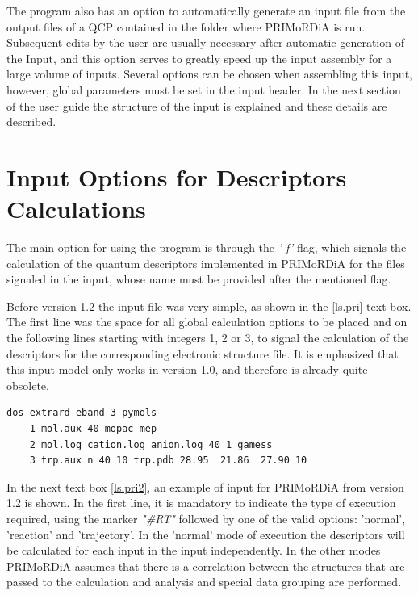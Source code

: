 \documentclass[a4paper,11pt]{refart}
\begin{document}
The program also has an option to automatically generate an input file from the output files of a QCP contained in the folder where PRIMoRDiA is run. Subsequent edits by the user are usually necessary after automatic generation of the Input, and this option serves to greatly speed up the input assembly for a large volume of inputs. Several options can be chosen when assembling this input, however, global parameters must be set in the input header. In the next section of the user guide the structure of the input is explained and these details are described.

\newpage

\section{Input Options for Descriptors Calculations}

The main option for using the program is through the \emph{'-f'} flag, which signals the calculation of the quantum descriptors implemented in PRIMoRDiA for the files signaled in the input, whose name must be provided after the mentioned flag.

Before version 1.2 the input file was very simple, as shown in the \autoref{ls.pri} text box. The first line was the space for all global calculation options to be placed and on the following lines starting with integers 1, 2 or 3, to signal the calculation of the descriptors for the corresponding electronic structure file. It is emphasized that this input model only works in version 1.0, and therefore is already quite obsolete.

\hspace*{-\leftmarginwidth}
\begin{minipage}{\fullwidth}
	\begin{lstlisting}[caption=Input example used in the old versions.,label={ls.pri}]
	dos extrard eband 3 pymols
	1 mol.aux 40 mopac mep
	2 mol.log cation.log anion.log 40 1 gamess 
	3 trp.aux n 40 10 trp.pdb 28.95  21.86  27.90 10 
	\end{lstlisting}
\end{minipage}

In the next text box \autoref{ls.pri2}, an example of input for PRIMoRDiA from version 1.2 is shown. In the first line, it is mandatory to indicate the type of execution required, using the marker \emph{"\#RT"} followed by one of the valid options: 'normal', 'reaction' and 'trajectory'. In the 'normal' mode of execution the descriptors will be calculated for each input in the input independently. In the other modes PRIMoRDiA assumes that there is a correlation between the structures that are passed to the calculation and analysis and special data grouping are performed.
\end{document}

